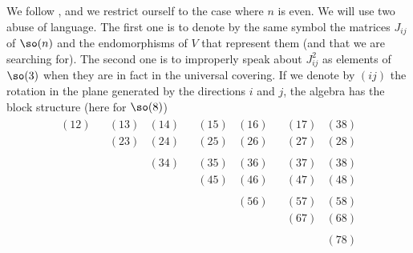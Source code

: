 We follow \cite{Dolan_son}, and we restrict ourself to the case where $n$ is even. We will use two abuse of language. The first one is to denote by the same symbol the matrices $J_{ij}$ of $\so(n)$ and the endomorphisms of $V$ that represent them (and that we are searching for). The second one is to improperly speak about $J_{ij}^2$ as elements of $\so(3)$ when they are in fact in the universal covering. If we denote by $(ij)$ the rotation in the plane generated by the directions $i$ and $j$, the algebra has the block structure (here for $\so(8)$)
\begin{equation}
	\begin{matrix}
		\begin{matrix}
			(12)\\\phantom{(12)}
		\end{matrix}
		&
		\boxed{
		\begin{matrix}
			(13)&(14)\\
			(23)&(24)
		\end{matrix}
		}
		&
		\boxed{
		\begin{matrix}
			(15)&(16)\\
			(25)&(26)
		\end{matrix}
		}
		&
		\boxed{
		\begin{matrix}
			(17)&(38)\\
			(27)&(28)
		\end{matrix}
		}
		\\
		\begin{matrix}
			\phantom{(12)}\\\phantom{(33)}
		\end{matrix}
		&
		\begin{matrix}
			\phantom{(12)}&(34)\\\phantom{(45)}
		\end{matrix}
		&
		\boxed{
		\begin{matrix}
			(35)&(36)\\
			(45)&(46)
		\end{matrix}
		}
		&
		\boxed{
		\begin{matrix}
			(37)&(38)\\
			(47)&(48)
		\end{matrix}
		}
		\\
		&&
		\begin{matrix}
			\phantom{(12)}&(56)\\\phantom{(45)}
		\end{matrix}
		&
		\boxed{
		\begin{matrix}
			(57)&(58)\\
			(67)&(68)
		\end{matrix}
		}
		\\
		&&&
		\begin{matrix}
			\phantom{(12)}&(78)
		\end{matrix}
	\end{matrix}
\end{equation}
